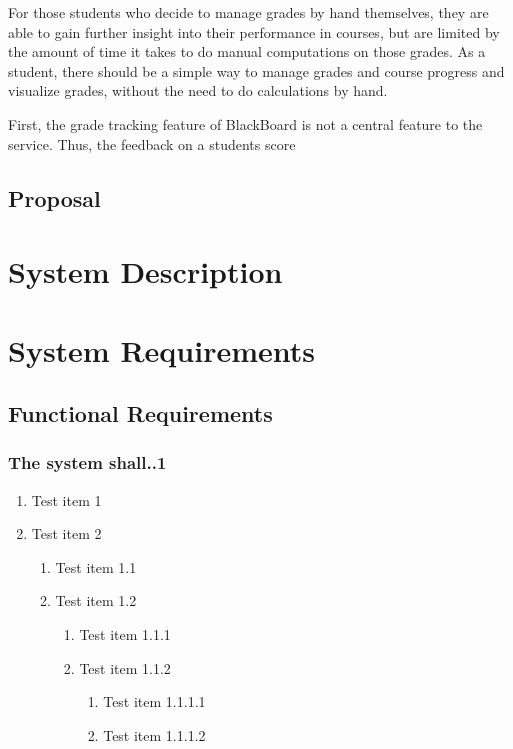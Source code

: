\documentclass[12pt]{article}
\newenvironment{requirement}[1]
{
    \renewcommand{\thesubsubsection}{R\arabic{subsubsection}.}
    \renewcommand{\labelenumi}{
        \arabic{subsubsection}.\arabic{enumi}
    }
    \renewcommand{\labelenumii}{
        \arabic{subsubsection}.\arabic{enumi}.\arabic{enumii}
    }
    \renewcommand{\labelenumiii}{
        \arabic{subsubsection}.\arabic{enumi}.\arabic{enumii}.\arabic{enumiii}
    }
    \renewcommand{\labelenumiv}{
        \arabic{subsubsection}.\arabic{enumi}.\arabic{enumii}.\arabic{enumiii}.\arabic{enumiv}
    }
    \subsubsection{#1}
}
{}
\begin{document}
For those students who decide to manage grades by hand themselves, they are able to
gain further insight into their performance in courses, but are limited by the amount of time it
takes to do manual computations on those grades. As a student, there should be a simple way to manage
grades and course progress and visualize grades, without the need to do calculations by hand.


First, the grade tracking feature of BlackBoard is not a central feature to the service.
Thus, the feedback on a students score 
\subsection{Proposal}

\section{System Description}

\section{System Requirements}
\subsection{Functional Requirements}
\begin{requirement}{The system shall..1}


\begin{enumerate}
    \item Test item 1
    \item Test item 2
    \begin{enumerate}
        \item Test item 1.1
        \item Test item 1.2
        \begin{enumerate}
            \item Test item 1.1.1
            \item Test item 1.1.2
            \begin{enumerate}
                \item Test item 1.1.1.1
                \item Test item 1.1.1.2
            \end{enumerate}
        \end{enumerate}
    \end{enumerate}
\end{enumerate}


\end{requirement}
\end{document}
